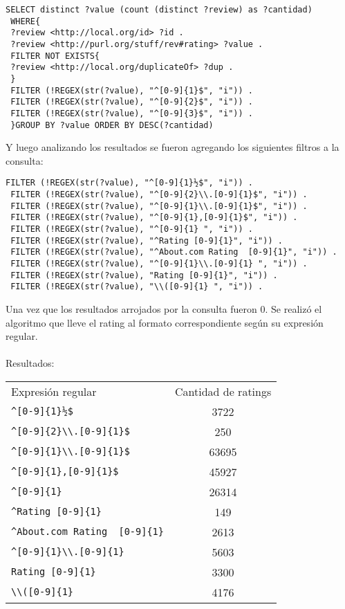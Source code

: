  \begin{lstlisting}[frame=single]
 SELECT distinct ?value (count (distinct ?review) as ?cantidad)
 WHERE{ 
 ?review <http://local.org/id> ?id .
 ?review <http://purl.org/stuff/rev#rating> ?value .
 FILTER NOT EXISTS{
 ?review <http://local.org/duplicateOf> ?dup .
 }
 FILTER (!REGEX(str(?value), "^[0-9]{1}$", "i")) .
 FILTER (!REGEX(str(?value), "^[0-9]{2}$", "i")) .
 FILTER (!REGEX(str(?value), "^[0-9]{3}$", "i")) .
 }GROUP BY ?value ORDER BY DESC(?cantidad)
 \end{lstlisting}
 Y luego analizando los resultados se fueron agregando los siguientes filtros a la consulta:\\
 \begin{lstlisting}[frame=single]
 FILTER (!REGEX(str(?value), "^[0-9]{1}½$", "i")) . 
 FILTER (!REGEX(str(?value), "^[0-9]{2}\\.[0-9]{1}$", "i")) .
 FILTER (!REGEX(str(?value), "^[0-9]{1}\\.[0-9]{1}$", "i")) . 
 FILTER (!REGEX(str(?value), "^[0-9]{1},[0-9]{1}$", "i")) .
 FILTER (!REGEX(str(?value), "^[0-9]{1} ", "i")) .  
 FILTER (!REGEX(str(?value), "^Rating [0-9]{1}", "i")) .  
 FILTER (!REGEX(str(?value), "^About.com Rating  [0-9]{1}", "i")) . 
 FILTER (!REGEX(str(?value), "^[0-9]{1}\\.[0-9]{1} ", "i")) .  
 FILTER (!REGEX(str(?value), "Rating [0-9]{1}", "i")) .
 FILTER (!REGEX(str(?value), "\\([0-9]{1} ", "i")) .
 \end{lstlisting}
 Una vez que los resultados arrojados por la consulta fueron 0. Se realizó el algoritmo que lleve el rating al formato correspondiente 
 según su expresión regular.\\
 \\
 Resultados:\\
 \begin{tabular}{| l | c |}
 Expresión regular & Cantidad de ratings \\
 \verb|^[0-9]{1}½$| & 3722\\
 \verb|^[0-9]{2}\\.[0-9]{1}$| & 250\\
 \verb|^[0-9]{1}\\.[0-9]{1}$| & 63695\\
 \verb|^[0-9]{1},[0-9]{1}$| & 45927\\
 \verb|^[0-9]{1} | & 26314\\
 \verb|^Rating [0-9]{1}| & 149\\
 \verb|^About.com Rating  [0-9]{1}| & 2613\\
 \verb|^[0-9]{1}\\.[0-9]{1} | & 5603\\
 \verb|Rating [0-9]{1}| & 3300\\
 \verb|\\([0-9]{1} | & 4176 
 \end{tabular}